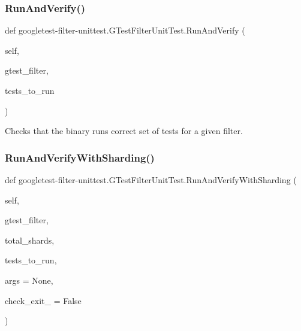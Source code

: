 \subsubsection{\texorpdfstring{Run\+And\+Verify()}{RunAndVerify()}}
{\footnotesize\ttfamily def googletest-\/filter-\/unittest.\+G\+Test\+Filter\+Unit\+Test.\+Run\+And\+Verify (\begin{DoxyParamCaption}\item[{}]{self,  }\item[{}]{gtest\+\_\+filter,  }\item[{}]{tests\+\_\+to\+\_\+run }\end{DoxyParamCaption})}

\begin{DoxyVerb}Checks that the binary runs correct set of tests for a given filter.\end{DoxyVerb}
 \mbox{\label{classgoogletest-filter-unittest_1_1_g_test_filter_unit_test_a9facb1098281a67776081c772fdd78d5}} 
\subsubsection{\texorpdfstring{Run\+And\+Verify\+With\+Sharding()}{RunAndVerifyWithSharding()}}
{\footnotesize\ttfamily def googletest-\/filter-\/unittest.\+G\+Test\+Filter\+Unit\+Test.\+Run\+And\+Verify\+With\+Sharding (\begin{DoxyParamCaption}\item[{}]{self,  }\item[{}]{gtest\+\_\+filter,  }\item[{}]{total\+\_\+shards,  }\item[{}]{tests\+\_\+to\+\_\+run,  }\item[{}]{args = {\ttfamily None},  }\item[{}]{check\+\_\+exit\+\_ = {\ttfamily False} }\end{DoxyParamCaption})}

